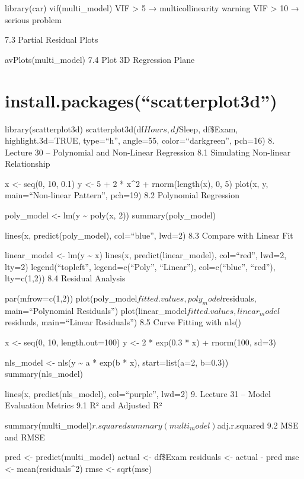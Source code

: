 \documentclass[
  letterpaper,
  DIV=11,
  numbers=noendperiod]{scrreprt}
\begin{document}
library(car) vif(multi\_model) VIF \textgreater{} 5 → multicollinearity
warning VIF \textgreater{} 10 → serious problem

7.3 Partial Residual Plots

avPlots(multi\_model) 7.4 Plot 3D Regression Plane

\section{install.packages(``scatterplot3d'')}\label{install.packagesscatterplot3d}

library(scatterplot3d) scatterplot3d(df\(Hours, df\)Sleep, df\$Exam,
highlight.3d=TRUE, type=``h'', angle=55, color=``darkgreen'', pch=16) 8.
Lecture 30 -- Polynomial and Non-Linear Regression 8.1 Simulating
Non-linear Relationship

x \textless- seq(0, 10, 0.1) y \textless- 5 + 2 * x\^{}2 +
rnorm(length(x), 0, 5) plot(x, y, main=``Non-linear Pattern'', pch=19)
8.2 Polynomial Regression

poly\_model \textless- lm(y \textasciitilde{} poly(x, 2))
summary(poly\_model)

lines(x, predict(poly\_model), col=``blue'', lwd=2) 8.3 Compare with
Linear Fit

linear\_model \textless- lm(y \textasciitilde{} x) lines(x,
predict(linear\_model), col=``red'', lwd=2, lty=2) legend(``topleft'',
legend=c(``Poly'', ``Linear''), col=c(``blue'', ``red''), lty=c(1,2))
8.4 Residual Analysis

par(mfrow=c(1,2))
plot(poly\_model\(fitted.values, poly_model\)residuals,
main=``Polynomial Residuals'')
plot(linear\_model\(fitted.values, linear_model\)residuals,
main=``Linear Residuals'') 8.5 Curve Fitting with nls()

x \textless- seq(0, 10, length.out=100) y \textless- 2 * exp(0.3 * x) +
rnorm(100, sd=3)

nls\_model \textless- nls(y \textasciitilde{} a * exp(b * x),
start=list(a=2, b=0.3)) summary(nls\_model)

lines(x, predict(nls\_model), col=``purple'', lwd=2) 9. Lecture 31 --
Model Evaluation Metrics 9.1 R² and Adjusted R²

summary(multi\_model)\(r.squared
summary(multi_model)\)adj.r.squared 9.2 MSE and RMSE

pred \textless- predict(multi\_model) actual \textless- df\$Exam
residuals \textless- actual - pred mse \textless- mean(residuals\^{}2)
rmse \textless- sqrt(mse)
\end{document}
